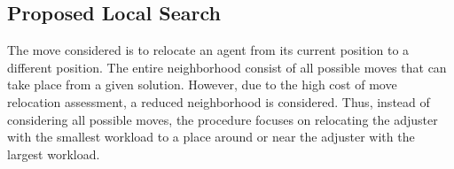 \subsection{Proposed Local Search}
The move considered
is to relocate an agent from its current position
to a different position.
The entire neighborhood
consist of all possible moves
that can take place from a given solution.
However,
due to the high cost of move relocation assessment,
a reduced neighborhood is considered.
Thus,
instead of considering all possible moves,
the procedure focuses on relocating the adjuster
with the smallest workload
to a place around or near the adjuster with the largest workload.
